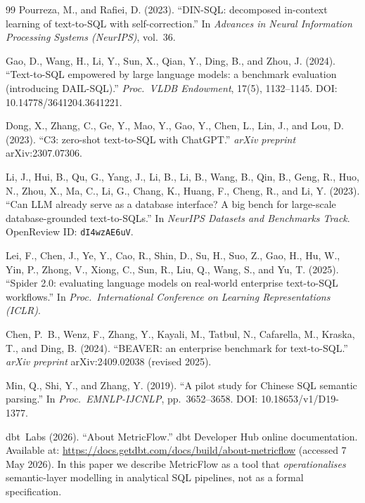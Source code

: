\documentclass[11pt]{article}
\begin{document}
\begin{thebibliography}{99}
 Pourreza, M., and Rafiei, D. (2023). ``DIN-SQL: decomposed in-context learning of text-to-SQL with self-correction.'' In \emph{Advances in Neural Information Processing Systems (NeurIPS)}, vol.~36.

 Gao, D., Wang, H., Li, Y., Sun, X., Qian, Y., Ding, B., and Zhou, J. (2024). ``Text-to-SQL empowered by large language models: a benchmark evaluation (introducing DAIL-SQL).'' \emph{Proc.\ VLDB Endowment}, 17(5), 1132--1145. DOI: 10.14778/3641204.3641221.

 Dong, X., Zhang, C., Ge, Y., Mao, Y., Gao, Y., Chen, L., Lin, J., and Lou, D. (2023). ``C3: zero-shot text-to-SQL with ChatGPT.'' \emph{arXiv preprint} arXiv:2307.07306.

 Li, J., Hui, B., Qu, G., Yang, J., Li, B., Li, B., Wang, B., Qin, B., Geng, R., Huo, N., Zhou, X., Ma, C., Li, G., Chang, K., Huang, F., Cheng, R., and Li, Y. (2023). ``Can LLM already serve as a database interface? A big bench for large-scale database-grounded text-to-SQLs.'' In \emph{NeurIPS Datasets and Benchmarks Track}. OpenReview ID: \texttt{dI4wzAE6uV}.

 Lei, F., Chen, J., Ye, Y., Cao, R., Shin, D., Su, H., Suo, Z., Gao, H., Hu, W., Yin, P., Zhong, V., Xiong, C., Sun, R., Liu, Q., Wang, S., and Yu, T. (2025). ``Spider 2.0: evaluating language models on real-world enterprise text-to-SQL workflows.'' In \emph{Proc.\ International Conference on Learning Representations (ICLR)}.

 Chen, P.~B., Wenz, F., Zhang, Y., Kayali, M., Tatbul, N., Cafarella, M., Kraska, T., and Ding, B. (2024). ``BEAVER: an enterprise benchmark for text-to-SQL.'' \emph{arXiv preprint} arXiv:2409.02038 (revised 2025).

 Min, Q., Shi, Y., and Zhang, Y. (2019). ``A pilot study for Chinese SQL semantic parsing.'' In \emph{Proc.\ EMNLP-IJCNLP}, pp.~3652--3658. DOI: 10.18653/v1/D19-1377.

 dbt~Labs (2026). ``About MetricFlow.'' dbt Developer Hub online documentation. Available at: \url{https://docs.getdbt.com/docs/build/about-metricflow} (accessed 7 May 2026). In this paper we describe MetricFlow as a tool that \emph{operationalises} semantic-layer modelling in analytical SQL pipelines, not as a formal specification.

\end{thebibliography}
\end{document}
